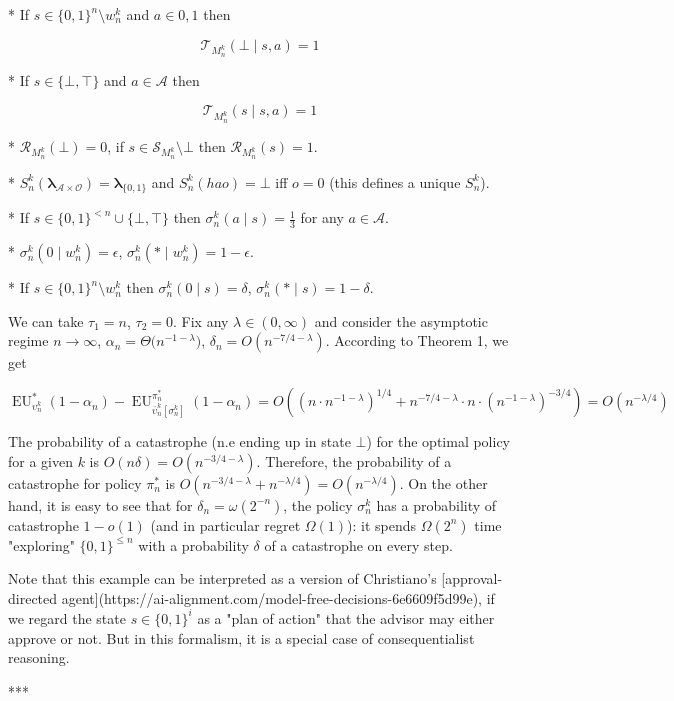 \documentclass[a4paper]{article}
\newcommand{\Bool}{\{0,1\}}
\newcommand{\AP}[1]{\left(#1\right)}
\newcommand{\AB}[1]{\left[#1\right]}
\newcommand{\Estr}{\boldsymbol{\lambda}}
\newcommand{\Ob}{\mathcal{O}}
\newcommand{\A}{\mathcal{A}}
\newcommand{\St}{\mathcal{S}}
\newcommand{\T}{\mathcal{T}}
\newcommand{\R}{\mathcal{R}}
\newcommand{\EU}{\operatorname{EU}}
\begin{document}
* If $s \in \Bool^n \setminus w_n^k$ and $a \in {0,1}$ then

$$\T_{M_n^k}(\bot \mid s,a) = 1$$

* If $s \in \{\bot,\top\}$ and $a \in \A$ then

$$\T_{M_n^k}(s \mid s,a) = 1$$

* $\R_{M_n^k}(\bot)=0$, if $s \in \St_{M_n^k} \setminus \bot$ then $\R_{M_n^k}(s)=1$.

* $S_n^k(\Estr_{\A \times \Ob})=\Estr_{\Bool}$ and $S_n^k(hao)=\bot$ iff $o = 0$ (this defines a unique $S_n^k$).

* If $s \in \Bool^{<n} \cup \{\bot,\top\}$ then $\sigma_n^k(a \mid s) = \frac{1}{3}$ for any $a \in \A$.

* $\sigma_n^k(0 \mid w_n^k) = \epsilon$, $\sigma_n^k(* \mid w_n^k) = 1 - \epsilon$.

* If $s \in \Bool^n \setminus w_n^k$ then $\sigma_n^k(0 \mid s) = \delta$, $\sigma_n^k(* \mid s) = 1 - \delta$.

We can take $\tau_1 = n$, $\tau_2 = 0$. Fix any $\lambda \in (0,\infty)$ and consider the asymptotic regime $n \rightarrow \infty$, $\alpha_n = \Theta\Big(n^{-1-\lambda}\Big)$, $\delta_n = O\AP{n^{-7/4-\lambda}}$. According to Theorem 1, we get

$$\EU_{\upsilon_n^k}^*(1-\alpha_n) - \EU_{\bar{\upsilon}_n^k\AB{\sigma_n^k}}^{\pi_n^*}(1-\alpha_n) = O\AP{\AP{n \cdot n^{-1-\lambda}}^{1/4}+n^{-7/4-\lambda}\cdot n \cdot \AP{n^{-1-\lambda}}^{-3/4}} = O\AP{n^{-\lambda/4}}$$

The probability of a catastrophe (n.e ending up in state $\bot$) for the optimal policy for a given $k$ is $O\AP{n\delta}=O\AP{n^{-3/4-\lambda}}$. Therefore, the probability of a catastrophe for policy $\pi_n^*$ is $O\AP{n^{-3/4-\lambda}+n^{-\lambda/4}}=O\AP{n^{-\lambda/4}}$. On the other hand, it is easy to see that for $\delta_n = \omega\AP{2^{-n}}$, the policy $\sigma_n^k$ has a probability of catastrophe $1-o(1)$ (and in particular  regret $\Omega(1)$): it spends $\Omega(2^n)$ time "exploring" $\Bool^{\leq n}$ with a probability $\delta$ of a catastrophe on every step.

Note that this example can be interpreted as a version of Christiano's [approval-directed agent](https://ai-alignment.com/model-free-decisions-6e6609f5d99e), if we regard the state $s \in \Bool^{i}$ as a "plan of action" that the advisor may either approve or not. But in this formalism, it is a special case of consequentialist reasoning.

***
\end{document}
